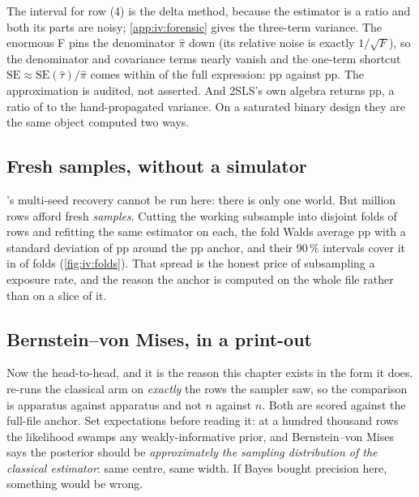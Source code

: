 The interval for row (4) is the delta method, because the estimator is a ratio and both its parts
are noisy; \cref{app:iv:forensic} gives the three-term variance. The enormous F pins the denominator
$\hat\pi$ down (its relative noise is exactly $1/\sqrt{F}$), so the denominator and covariance
terms nearly vanish and the one-term shortcut $\text{SE} \approx \text{SE}(\hat\tau)/\hat\pi$ comes
within \pc{\nbElevenBSeShortGap} of the full expression: \nbElevenBSeShort{} pp against
\nbElevenBSeDelta{} pp. The approximation is audited, not asserted. And 2SLS's own algebra returns
\nbElevenBSeTwosls{} pp, a ratio of \nbElevenBSeTwoslsRatio{} to the hand-propagated variance. On
a saturated binary design they are the same object computed two ways.

\subsection*{Fresh samples, without a simulator}

's multi-seed recovery cannot be run here: there is only one world. But
\nbElevenBNFullM{} million rows afford fresh \emph{samples}. Cutting the working subsample into
\nbElevenBNFolds{} disjoint folds of \nbElevenBFoldRows{} rows and refitting the same estimator on
each, the fold Walds average \nbElevenBFoldMean{} pp with a standard deviation of
\nbElevenBFoldSd{} pp around the \nbElevenBAnchorWald{} pp anchor, and their 90\,\% intervals cover
it in \pc{\nbElevenBFoldCover} of folds (\cref{fig:iv:folds}). That spread is the honest price of
subsampling a \pc{\nbElevenBPExposedEligible} exposure rate, and the reason the anchor is
computed on the whole file rather than on a slice of it.




\subsection*{Bernstein--von Mises, in a print-out}



Now the head-to-head, and it is the reason this chapter exists in the form it does.
 re-runs the classical arm on \emph{exactly} the \nbElevenBNFit{} rows the
sampler saw, so the comparison is apparatus against apparatus and not $n$ against $n$. Both are
scored against the full-file anchor. Set expectations before reading it: at a hundred thousand rows
the likelihood swamps any weakly-informative prior, and Bernstein--von Mises says the posterior
should be \emph{approximately the sampling distribution of the classical estimator}: same centre,
same width. If Bayes bought precision here, something would be wrong.

